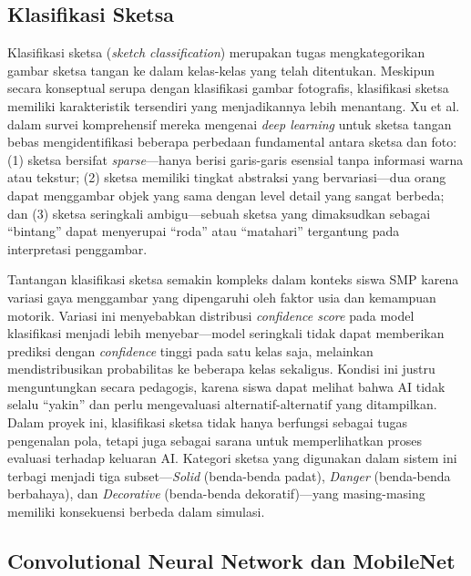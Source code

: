\documentclass[12pt,a4paper,oneside,openany]{report}
\begin{document}
\subsection{Klasifikasi Sketsa}
\label{subsec:klasifikasi-sketsa}

Klasifikasi sketsa (\textit{sketch classification}) merupakan tugas mengkategorikan gambar sketsa tangan ke dalam kelas-kelas yang telah ditentukan. Meskipun secara konseptual serupa dengan klasifikasi gambar fotografis, klasifikasi sketsa memiliki karakteristik tersendiri yang menjadikannya lebih menantang. Xu et al. \cite{ref6} dalam survei komprehensif mereka mengenai \textit{deep learning} untuk sketsa tangan bebas mengidentifikasi beberapa perbedaan fundamental antara sketsa dan foto: (1) sketsa bersifat \textit{sparse}---hanya berisi garis-garis esensial tanpa informasi warna atau tekstur; (2) sketsa memiliki tingkat abstraksi yang bervariasi---dua orang dapat menggambar objek yang sama dengan level detail yang sangat berbeda; dan (3) sketsa seringkali ambigu---sebuah sketsa yang dimaksudkan sebagai ``bintang'' dapat menyerupai ``roda'' atau ``matahari'' tergantung pada interpretasi penggambar.

Tantangan klasifikasi sketsa semakin kompleks dalam konteks siswa SMP karena variasi gaya menggambar yang dipengaruhi oleh faktor usia dan kemampuan motorik. Variasi ini menyebabkan distribusi \textit{confidence score} pada model klasifikasi menjadi lebih menyebar---model seringkali tidak dapat memberikan prediksi dengan \textit{confidence} tinggi pada satu kelas saja, melainkan mendistribusikan probabilitas ke beberapa kelas sekaligus. Kondisi ini justru menguntungkan secara pedagogis, karena siswa dapat melihat bahwa AI tidak selalu ``yakin'' dan perlu mengevaluasi alternatif-alternatif yang ditampilkan. Dalam proyek ini, klasifikasi sketsa tidak hanya berfungsi sebagai tugas pengenalan pola, tetapi juga sebagai sarana untuk memperlihatkan proses evaluasi terhadap keluaran AI. Kategori sketsa yang digunakan dalam sistem ini terbagi menjadi tiga subset---\textit{Solid} (benda-benda padat), \textit{Danger} (benda-benda berbahaya), dan \textit{Decorative} (benda-benda dekoratif)---yang masing-masing memiliki konsekuensi berbeda dalam simulasi.

\subsection{Convolutional Neural Network dan MobileNet}
\label{subsec:cnn-mobilenet}
\end{document}
